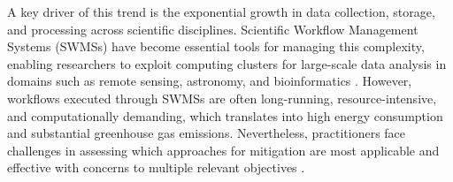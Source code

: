 
A key driver of this trend is the exponential growth in data collection, storage, and processing across scientific disciplines. Scientific Workflow Management Systems (SWMSs) have become essential tools for managing this complexity, enabling researchers to exploit computing clusters for large-scale data analysis in domains such as remote sensing, astronomy, and bioinformatics \cite{Coleman_2021}. However, workflows executed through SWMSs are often long-running, resource-intensive, and computationally demanding, which translates into high energy consumption and substantial greenhouse gas emissions. Nevertheless, practitioners face challenges in assessing which approaches for mitigation are most applicable and effective with concerns to multiple relevant objectives \cite{thamsen2025energyawareworkflowexecutionoverview}.

